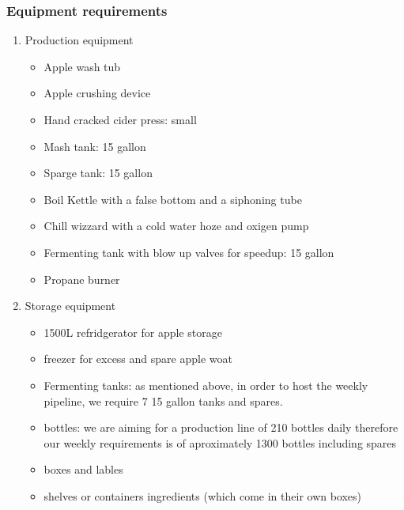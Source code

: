 \documentclass[11pt]{article}
\begin{document}
    \subsubsection{Equipment requirements}
    \begin{enumerate}
    \item Production equipment
      \begin{itemize}
      \item Apple wash tub
      \item Apple crushing device
      \item Hand cracked cider press: small
      \item Mash tank: 15 gallon
      \item Sparge tank: 15 gallon
      \item Boil Kettle with a false bottom and a siphoning tube
      \item Chill wizzard with a cold water hoze and oxigen pump
      \item Fermenting tank with blow up valves for speedup: 15 gallon
      \item Propane burner
      \end{itemize}

    \item Storage equipment
      \begin{itemize}
      \item 1500L refridgerator for apple storage
      \item freezer for excess and spare apple woat
      \item Fermenting tanks: as mentioned above, in order to host the weekly pipeline, we require 7 15 gallon tanks and spares.
      \item bottles: we are aiming for a production line of 210 bottles daily therefore our weekly requirements is of aproximately 1300 bottles including spares
      \item boxes and lables
      \item shelves or containers ingredients (which come in their own boxes)
      \end{itemize}


\end{enumerate}
\end{document}
